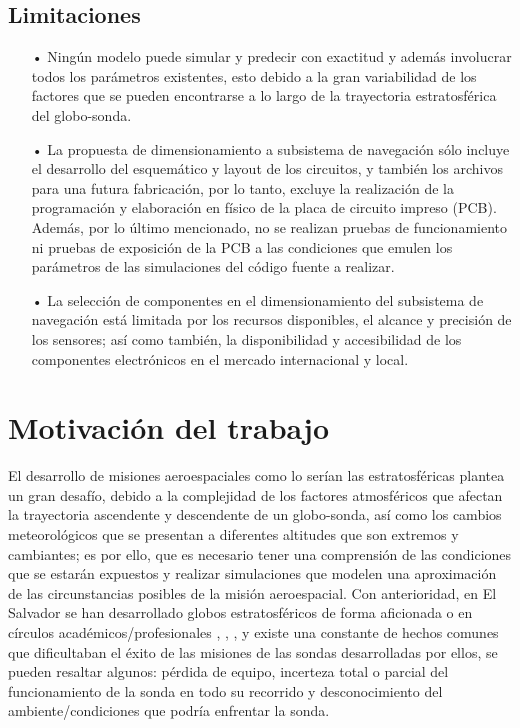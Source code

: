 \subsection{Limitaciones}

\begin{itemize}

    \item[•] Ningún modelo puede simular y predecir con exactitud y además involucrar todos los parámetros existentes, esto debido a la gran variabilidad de los factores que se pueden encontrarse a lo largo de la trayectoria estratosférica del globo-sonda.

    \item[•] La propuesta de dimensionamiento a subsistema de navegación sólo incluye el desarrollo del esquemático y layout de los circuitos, y también los archivos para una futura fabricación, por lo tanto, excluye la realización de la programación y elaboración en físico de la placa de circuito impreso (PCB). Además, por lo último mencionado, no se realizan pruebas de funcionamiento ni pruebas de exposición de la PCB a las condiciones que emulen los parámetros de las simulaciones del código fuente a realizar.

    \item[•] La selección de componentes en el dimensionamiento del subsistema de navegación está limitada por los recursos disponibles, el alcance y precisión de los sensores; así como también, la disponibilidad y accesibilidad de los componentes electrónicos en el mercado internacional y local.

\end{itemize}

\newpage

\section{Motivación del trabajo} \label{sct:intro:motivacion}

El desarrollo de misiones aeroespaciales como lo serían las estratosféricas plantea un gran desafío, debido a la complejidad de los factores atmosféricos que afectan la trayectoria ascendente y descendente de un globo-sonda, así como los cambios meteorológicos que se presentan a diferentes altitudes que son extremos y cambiantes; es por ello, que es necesario tener una comprensión de las condiciones que se estarán expuestos y realizar simulaciones que modelen una aproximación de las circunstancias posibles de la misión aeroespacial. Con anterioridad, en El Salvador se han desarrollado globos estratosféricos de forma aficionada o en círculos académicos/profesionales \cite{globo_pupuseriasuiza_1},  \cite{globo_nayib_nuevocuscatlan}, \cite{sphere_ESAI}, y existe una constante de hechos comunes que dificultaban el éxito de las misiones de las sondas desarrolladas por ellos, se pueden resaltar algunos: pérdida de equipo, incerteza total o parcial del funcionamiento de la sonda en todo su recorrido y desconocimiento del ambiente/condiciones que podría enfrentar la sonda.


